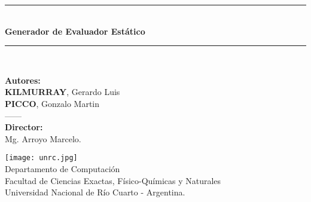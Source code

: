 \newcommand{\HRule}{\rule{\linewidth}{0.6mm}}
\begin{titlepage}

\begin{center}

\vspace*{1cm}
\HRule \\[0.5cm]
{ \Huge{\textbf{\sc Generador de Evaluador Est\'atico}}}\\[0.4cm]
 
\HRule \\[1.2cm]



\vspace*{1.2cm}

\Large{\textbf{Autores: }\\ \textbf{KILMURRAY}, Gerardo Luis\\ \textbf{PICCO}, Gonzalo Martin\\}
\vspace*{1cm}
{------\\}
\vspace*{1cm}
\textbf{Director:}\\ Mg. Arroyo Marcelo.

\vspace*{2cm}
 \texttt{[image: unrc.jpg]}\\
\vspace*{1cm}
\large{ Departamento de Computaci\'on \\ Facultad de Ciencias Exactas, F\'isico-Qu\'imicas y Naturales\\
     Universidad Nacional de R\'io Cuarto - Argentina.}

\end{center}
\end{titlepage}
\sloppy

\titlepage
